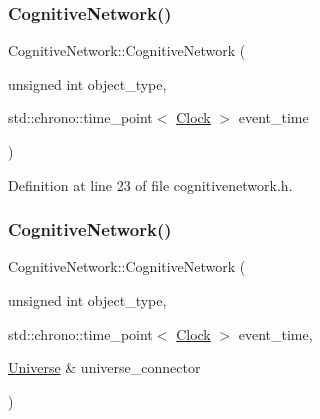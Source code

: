 \mbox{\label{class_cognitive_network_ac7ba285d3468a929dac88756a2c4e4f9}} 
\subsubsection{\texorpdfstring{Cognitive\+Network()}{CognitiveNetwork()}\hspace{0.1cm}{\footnotesize\ttfamily [3/4]}}
{\footnotesize\ttfamily Cognitive\+Network\+::\+Cognitive\+Network (\begin{DoxyParamCaption}\item[{unsigned int}]{object\+\_\+type,  }\item[{std\+::chrono\+::time\+\_\+point$<$ \mbox{\hyperlink{universe_8h_a0ef8d951d1ca5ab3cfaf7ab4c7a6fd80}{Clock}} $>$}]{event\+\_\+time }\end{DoxyParamCaption})\hspace{0.3cm}{\ttfamily [inline]}}



Definition at line 23 of file cognitivenetwork.\+h.

\mbox{\label{class_cognitive_network_a6ec49dcc8cc58cded71983291629179c}} 
\subsubsection{\texorpdfstring{Cognitive\+Network()}{CognitiveNetwork()}\hspace{0.1cm}{\footnotesize\ttfamily [4/4]}}
{\footnotesize\ttfamily Cognitive\+Network\+::\+Cognitive\+Network (\begin{DoxyParamCaption}\item[{unsigned int}]{object\+\_\+type,  }\item[{std\+::chrono\+::time\+\_\+point$<$ \mbox{\hyperlink{universe_8h_a0ef8d951d1ca5ab3cfaf7ab4c7a6fd80}{Clock}} $>$}]{event\+\_\+time,  }\item[{\mbox{\hyperlink{class_universe}{Universe}} \&}]{universe\+\_\+connector }\end{DoxyParamCaption})\hspace{0.3cm}{\ttfamily [inline]}}



